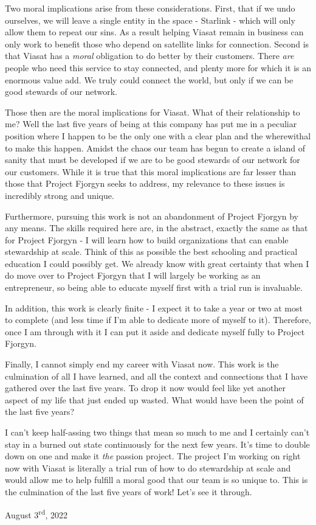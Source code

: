 \documentclass[10pt,a5paper]{book}
\begin{document}
Two moral implications arise from these considerations. First, that if we undo ourselves, we will leave a single entity in the space - Starlink - which will only allow them to repeat our sins. As a result helping Viasat remain in business can only work to benefit those who depend on satellite links for connection. Second is that Viasat has a \textit{moral} obligation to do better by their customers. There \textit{are} people who need this service to stay connected, and plenty more for which it is an enormous value add. We truly could connect the world, but only if we can be good stewards of our network. 

Those then are the moral implications for Viasat. What of their relationship to me? Well the last five years of being at this company has put me in a peculiar position where I happen to be the only one with a clear plan and the wherewithal to make this happen. Amidst the chaos our team has begun to create a island of sanity that must be developed if we are to be good stewards of our network for our customers. While it is true that this moral implications are far lesser than those that Project Fjorgyn seeks to address, my relevance to these issues is incredibly strong and unique. 

Furthermore, pursuing this work is not an abandonment of Project Fjorgyn by any means. The skills required here are, in the abstract, exactly the same as that for Project Fjorgyn - I will learn how to build organizations that can enable stewardship at scale. Think of this as possible the best schooling and practical education I could possibly get. We already know with great certainty that when I do move over to Project Fjorgyn that I will largely be working as an entrepreneur, so being able to educate myself first with a trial run is invaluable. 

In addition, this work is clearly finite - I expect it to take a year or two at most to complete (and less time if I'm able to dedicate more of myself to it). Therefore, once I am through with it I can put it aside and dedicate myself fully to Project Fjorgyn. 

Finally, I cannot simply end my career with Viasat now. This work is the culmination of all I have learned, and all the context and connections that I have gathered over the last five years. To drop it now would feel like yet another aspect of my life that just ended up wasted. What would have been the point of the last five years?

I can't keep half-assing two things that mean so much to me and I certainly can't stay in a burned out state continuously for the next few years. It's time to double down on one and make it \textit{the} passion project. The project I'm working on right now with Viasat is literally a trial run of how to do stewardship at scale and would allow me to help fulfill a moral good that our team is so unique to. This is the culmination of the last five years of work! Let's see it through.
\linebreak

August 3\textsuperscript{rd}, 2022
\end{document}
